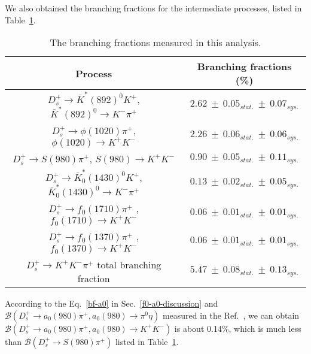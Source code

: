 {    We also obtained the branching fractions for the intermediate processes, listed in Table~\ref{total-BF}.
    \begin{table}[htbp]
        \caption{The branching fractions measured in this analysis.}
        \label{total-BF}
        \begin{center}
            \begin{tabular}{cc}
                \toprule\toprule
                Process & Branching fractions (\%)\\
                \hline
                $D_{s}^{+} \rightarrow \bar{K}^{*}(892)^{0}K^{+}$, $\bar{K}^{*}(892)^{0} \rightarrow K^{-}\pi^{+}$              & $2.62\ \pm\ 0.05_{stat.}\ \pm\ 0.07_{sys.}$  \\
                $D_{s}^{+} \rightarrow \phi(1020)\pi^{+}$, $\phi(1020) \rightarrow K^{+}K^{-}$                                  & $2.26\ \pm\ 0.06_{stat.}\ \pm\ 0.06_{sys.}$  \\
                $D_{s}^{+} \rightarrow S(980)\pi^{+}$, $S(980) \rightarrow K^{+}K^{-}$                                          & $0.90\ \pm\ 0.05_{stat.}\ \pm\ 0.11_{sys.}$  \\
                $D_{s}^{+} \rightarrow \bar{K}^{*}_{0}(1430)^{0}K^{+}$, $\bar{K}^{*}_{0}(1430)^{0} \rightarrow K^{-}\pi^{+}$    & $0.13\ \pm\ 0.02_{stat.}\ \pm\ 0.05_{sys.}$  \\
                $D_{s}^{+} \rightarrow f_{0}(1710)\pi^{+}$ ,$f_{0}(1710) \rightarrow K^{+}K^{-}$                                & $0.06\ \pm\ 0.01_{stat.}\ \pm\ 0.01_{sys.}$  \\
                $D_{s}^{+} \rightarrow f_{0}(1370)\pi^{+}$ ,$f_{0}(1370) \rightarrow K^{+}K^{-}$                                & $0.06\ \pm\ 0.01_{stat.}\ \pm\ 0.01_{sys.}$  \\
                $D_{s}^{+} \rightarrow K^{+}K^{-}\pi^{+}$ total branching fraction                                              & $5.47\ \pm\ 0.08_{stat.}\ \pm\ 0.13_{sys.}$ \\
                \bottomrule\bottomrule
            \end{tabular}
        \end{center}
    \end{table}
    According to the Eq.~\ref{bf-a0} in Sec.~\ref{f0-a0-discussion} and $\mathcal{B}(D_{s}^{+} \rightarrow a_{0}(980)\pi^{+}, a_{0}(980) \rightarrow \pi^{0}\eta)$ measured in the Ref.~\cite{Doc-DB-682-v7}, we can obtain $\mathcal{B}(D_{s}^{+} \rightarrow a_{0}(980)\pi^{+}, a_{0}(980) \rightarrow K^{+}K^{-})$ is about 0.14\%, which is much less than $\mathcal{B}(D_{s}^{+} \rightarrow S(980)\pi^{+})$ listed in Table~\ref{total-BF}. 
}
